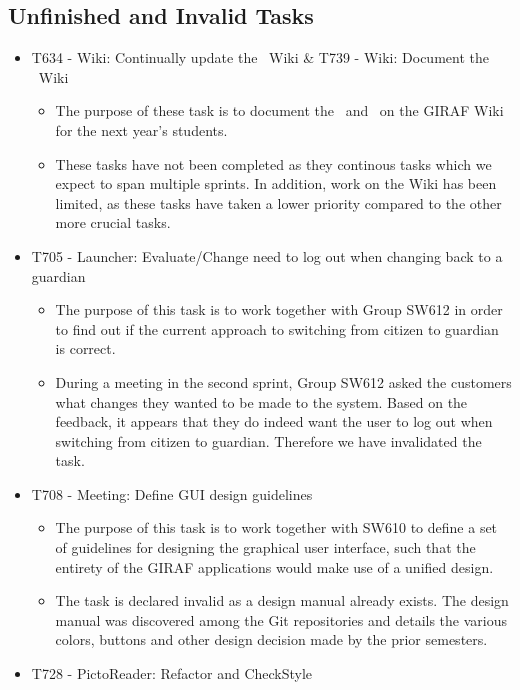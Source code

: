 \subsection{Unfinished and Invalid Tasks}\label{S2Invalid}
\begin{itemize}
  \item T634 - Wiki: Continually update the \lapp\ Wiki \& T739 -
  Wiki: Document the \plib\ Wiki
  \begin{itemize}
  	\item The purpose of these task is to document the \lapp\ and \plib\
  	on the GIRAF Wiki for the next year's students. 
  	\item These tasks have not been completed as they continous tasks which we
  	expect to span multiple sprints. In addition, work on the Wiki has been
  	limited, as these tasks have taken a lower priority compared to
  	the other more crucial tasks.
  \end{itemize}
  \item T705 - Launcher: Evaluate/Change need to log out when changing back to a
  guardian
  \begin{itemize}
  	\item The purpose of this task is to work together with Group SW612 in order
  	to find out if the current approach to switching from citizen to
  	guardian is correct. 
  	\item During a meeting in the second sprint, Group SW612 asked the customers
  	what changes they wanted to be made to the system. Based on the feedback, it
  	appears that they do indeed want the user to log out when switching from
  	citizen to guardian. Therefore we have invalidated the task.
  \end{itemize}
  \item T708 - Meeting: Define GUI design guidelines
  \begin{itemize}
    \item The purpose of this task is to work together with SW610 to define a
    set of guidelines for designing the graphical user interface, such that the
    entirety of the GIRAF applications would make use of a unified design.
    \item The task is declared invalid as a design manual already exists. The
    design manual was discovered among the Git repositories and details the
    various colors, buttons and other design decision made by the prior
    semesters.  
  \end{itemize}
  \item T728 - PictoReader: Refactor and CheckStyle

\end{itemize}
